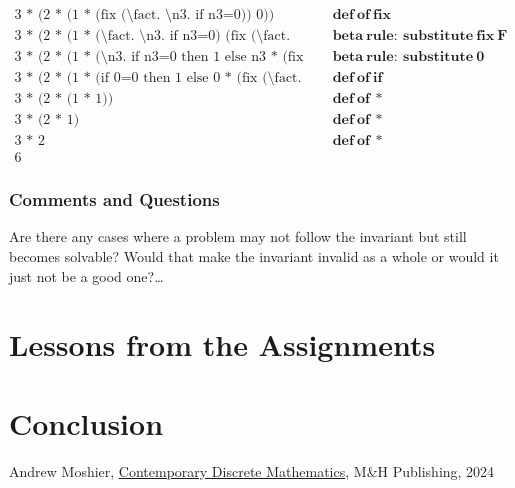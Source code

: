 \documentclass{article}
\theoremstyle{theorem}
\theoremstyle{definition}
\theoremstyle{remark}
\begin{document}
\begin{align*}
  \text{3 * (2 * (1 * (fix (\textbackslash fact. \textbackslash n3. if n3=0)) 0))} & \quad \mathbf{def\ of\ fix} \\
  \text{3 * (2 * (1 * (\textbackslash fact. \textbackslash n3. if n3=0) (fix (\textbackslash fact. \textbackslash n3. if n3=0)) 0))} & \quad \mathbf{beta\ rule:\ substitute\ fix\ F} \\
  \text{3 * (2 * (1 * (\textbackslash n3. if n3=0 then 1 else n3 * (fix (\textbackslash fact. \textbackslash n4. if n4=0)) (n3-1)) 0))} & \quad \mathbf{beta\ rule:\ substitute\ 0} \\
  \text{3 * (2 * (1 * (if 0=0 then 1 else 0 * (fix (\textbackslash fact. \textbackslash n4. if n4=0)) (0-1))))} & \quad \mathbf{def\ of\ if} \\
  \text{3 * (2 * (1 * 1))} & \quad \mathbf{def\ of\ *} \\
  \text{3 * (2 * 1)} & \quad \mathbf{def\ of\ *} \\
  \text{3 * 2} & \quad \mathbf{def\ of\ *} \\
  \text{6} &
\end{align*}


\subsubsection{Comments and Questions}

Are there any cases where a problem may not follow the invariant but still becomes solvable? Would that make the invariant invalid as a whole or would it just not be a good one?\ldots

\section{Lessons from the Assignments}

\section{Conclusion}\label{conclusion}

\begin{thebibliography}{99}
 Andrew Moshier, \href{https://canvas.chapman.edu/courses/66029/files/6581500?module_item_id=2280521}{Contemporary Discrete Mathematics}, M\&H Publishing, 2024
\end{thebibliography}
\end{document}
